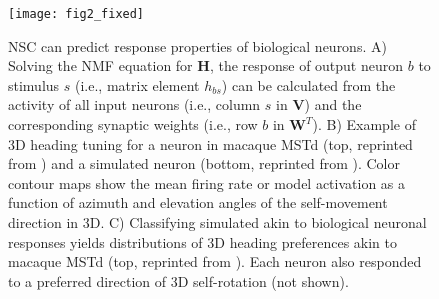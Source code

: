 \begin{figure}[h]
	\centering
	\texttt{[image: fig2\_fixed]}
    \caption{\ac{NSC} can predict response properties of biological neurons.
    A) Solving the \ac{NMF} equation for \textbf{H}, the response
       of output neuron $b$ to stimulus $s$ (i.e., matrix element
       $h_{bs}$) can be calculated from the activity of all
       input neurons (i.e., column $s$ in \textbf{V}) and the
       corresponding synaptic weights (i.e., row $b$ in
       $\mathbf{W}^T$).
    B) Example of 3D heading tuning for a neuron in macaque
       \ac{MSTd} (top, reprinted from \cite{Takahashi2007}) and a
       simulated neuron (bottom, reprinted from \cite{Beyeler2016}).
       Color contour maps show the mean firing rate or model
       activation as a function of azimuth and elevation angles
       of the self-movement direction in 3D.
    C) Classifying simulated akin to biological neuronal responses
       yields distributions of 3D heading preferences akin to 
       macaque \ac{MSTd} (top, reprinted from \cite{Beyeler2016}).
       Each neuron also responded to a preferred direction of 3D
       self-rotation (not shown).}
	\label{fig:NMF|neuronalresponse}
\end{figure}



